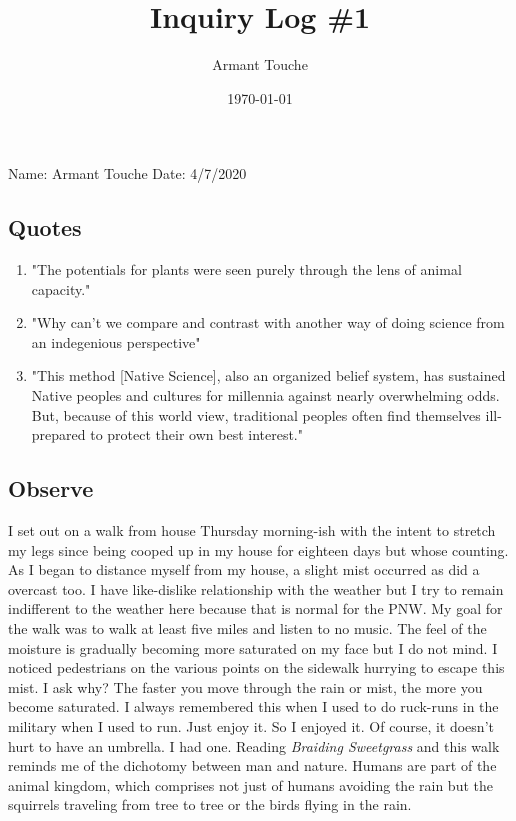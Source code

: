 \documentclass[a4paper,man,biblatex]{apa6}
\title{Inquiry Log \#1}
\author{Armant Touche}
\affiliation{Portland State University}
\date{\today}
\begin{document}
\thispagestyle{otherpage}
\setcounter{biburllcpenalty}{7000}
\setcounter{biburlucpenalty}{8000}


\noindent Name: Armant Touche\newline
\noindent Date: 4/7/2020

\subsection{Quotes}
\begin{enumerate}
    \item "The potentials for plants were seen purely through the lens of animal capacity."\autocite[19]{braiding}
    \item "Why can't we compare and contrast with another way of doing science from an indegenious perspective" \autocite{twoeyes}
    \item "This method [Native Science], also an organized belief system, has sustained Native peoples and cultures for millennia against nearly overwhelming odds.  But, because of this world view, traditional peoples often find themselves ill-prepared to protect their own best interest." \autocite{westvsnative}
\end{enumerate}

\subsection{Observe} I set out on a walk from house Thursday morning-ish with the intent to stretch my legs since being cooped up in my house for eighteen days but whose counting. As I began to distance myself from my house, a slight mist occurred as did a overcast too. I have like-dislike relationship with the weather but I try to remain indifferent to the weather here because that is normal for the PNW. My goal for the walk was to walk at least five miles and listen to no music. The feel of the moisture is gradually becoming more saturated on my face but I do not mind. I noticed pedestrians on the various points on the sidewalk hurrying to escape this mist. I ask why? The faster you move through the rain or mist, the more you become saturated. I always remembered this when I used to do ruck-runs in the military when I used to run. Just enjoy it. So I enjoyed it. Of course, it doesn't hurt to have an umbrella. I had one. Reading \textit{Braiding Sweetgrass} and this walk reminds me of the dichotomy between man and nature. Humans are part of the animal kingdom, which comprises not just of humans avoiding the rain but the squirrels traveling from tree to tree or the birds flying in the rain.  
\end{document}
